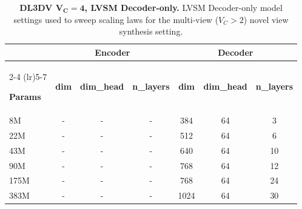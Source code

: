 \begin{table}[t]
\centering
\begin{threeparttable}

\footnotesize            %
\setlength{\tabcolsep}{4pt}  %

\begin{tabular}{lcccccc}   %
\toprule

& \multicolumn{3}{c}{\textbf{Encoder}}
& \multicolumn{3}{c}{\textbf{Decoder}} \\
\cmidrule(lr){2-4} \cmidrule(lr){5-7}

\textbf{Params}
& \textbf{dim} & \textbf{dim\_head} & \textbf{n\_layers}
& \textbf{dim} & \textbf{dim\_head} & \textbf{n\_layers} \\
\midrule

8M & - & - & - & 384 & 64 & 3 \\
22M & - & - & - & 512 & 64 & 6 \\
43M & - & - & - & 640 & 64 & 10 \\
90M & - & - & - & 768 & 64 & 12 \\
175M & - & - & - & 768 & 64 & 24 \\
383M & - & - & - & 1024 & 64 & 30 \\

\bottomrule
\end{tabular}

\caption{\textbf{DL3DV $\boldsymbol{V_C}\mathbf{{=}4}$, LVSM Decoder-only.} LVSM Decoder-only model settings used to sweep scaling laws for the multi-view ($V_C > 2$) novel view synthesis setting.}
\vspace{-0.5cm}
\label{tab:dec-only-dl3dv-details}
\end{threeparttable}
\end{table}

